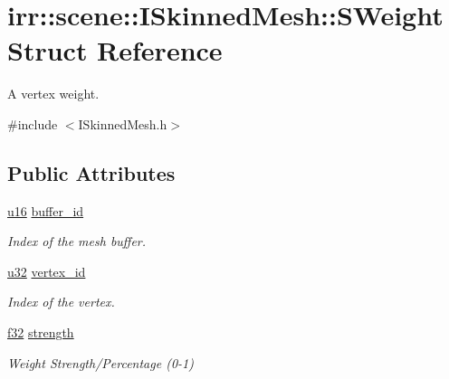\hypertarget{structirr_1_1scene_1_1ISkinnedMesh_1_1SWeight}{}\section{irr\+:\+:scene\+:\+:I\+Skinned\+Mesh\+:\+:S\+Weight Struct Reference}
\label{structirr_1_1scene_1_1ISkinnedMesh_1_1SWeight}


A vertex weight.  




{\ttfamily \#include $<$I\+Skinned\+Mesh.\+h$>$}

\subsection*{Public Attributes}
\begin{DoxyCompactItemize}
\item 
\mbox{\label{structirr_1_1scene_1_1ISkinnedMesh_1_1SWeight_acc9e699fd4dc2ba4f5a8f0cc1b2f99d4}} 
\hyperlink{namespaceirr_ae9f8ec82692ad3b83c21f555bfa70bcc}{u16} \hyperlink{structirr_1_1scene_1_1ISkinnedMesh_1_1SWeight_acc9e699fd4dc2ba4f5a8f0cc1b2f99d4}{buffer\+\_\+id}
\begin{DoxyCompactList}\small\item\em Index of the mesh buffer. \end{DoxyCompactList}\item 
\mbox{\label{structirr_1_1scene_1_1ISkinnedMesh_1_1SWeight_aeccead1b5bb574aa4232c693a55dfed7}} 
\hyperlink{namespaceirr_a0416a53257075833e7002efd0a18e804}{u32} \hyperlink{structirr_1_1scene_1_1ISkinnedMesh_1_1SWeight_aeccead1b5bb574aa4232c693a55dfed7}{vertex\+\_\+id}
\begin{DoxyCompactList}\small\item\em Index of the vertex. \end{DoxyCompactList}\item 
\mbox{\label{structirr_1_1scene_1_1ISkinnedMesh_1_1SWeight_a090246843a5a57bb5ac1afb15c02538b}} 
\hyperlink{namespaceirr_a0277be98d67dc26ff93b1a6a1d086b07}{f32} \hyperlink{structirr_1_1scene_1_1ISkinnedMesh_1_1SWeight_a090246843a5a57bb5ac1afb15c02538b}{strength}
\begin{DoxyCompactList}\small\item\em Weight Strength/\+Percentage (0-\/1) \end{DoxyCompactList}\end{DoxyCompactItemize}
